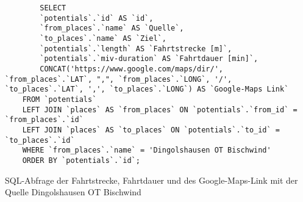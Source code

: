 \begin{listing}[htbp]
    \begin{verbatim}
        SELECT 
        `potentials`.`id` AS `id`, 
        `from_places`.`name` AS `Quelle`,
        `to_places`.`name` AS `Ziel`, 
        `potentials`.`length` AS `Fahrtstrecke [m]`, 
        `potentials`.`miv-duration` AS `Fahrtdauer [min]`,
        CONCAT('https://www.google.com/maps/dir/', `from_places`.`LAT`, ",", `from_places`.`LONG`, '/', `to_places`.`LAT`, ',', `to_places`.`LONG`) AS `Google-Maps Link`
    FROM `potentials`
    LEFT JOIN `places` AS `from_places` ON `potentials`.`from_id` = `from_places`.`id`
    LEFT JOIN `places` AS `to_places` ON `potentials`.`to_id` = `to_places`.`id`
    WHERE `from_places`.`name` = 'Dingolshausen OT Bischwind'
    ORDER BY `potentials`.`id`;
    \end{verbatim}
    \caption{SQL-Abfrage der Fahrtstrecke, Fahrtdauer und des Google-Maps-Link mit der Quelle Dingolshausen OT Bischwind}\label{lst-f-bischwind}
\end{listing}
